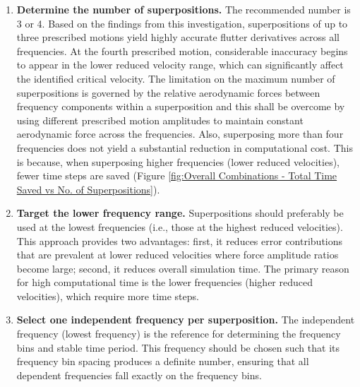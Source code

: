 \documentclass[../main]{subfiles}
\begin{document}
\begin{enumerate}
    \item \textbf{Determine the number of superpositions.} The recommended number is 3 or 4. Based on the 
          findings from this investigation, superpositions of up to three prescribed motions yield highly 
          accurate flutter derivatives across all frequencies.
          At the fourth prescribed motion, considerable 
          inaccuracy begins to appear in the lower reduced velocity range, 
          which can significantly affect the identified critical velocity.
          The limitation on the maximum 
          number of superpositions is governed by the relative aerodynamic forces between frequency components 
          within a superposition and this shall be overcome by using different prescribed motion amplitudes to maintain constant aerodynamic force across the frequencies.
          Also, superposing more than four frequencies does not yield a substantial reduction in 
          computational cost.
          This is because, when superposing higher frequencies (lower reduced velocities), 
          fewer time steps are saved (Figure \ref{fig:Overall Combinations - Total Time Saved vs No. of Superpositions}).

    \item \textbf{Target the lower frequency range.} Superpositions should preferably be used at the lowest 
          frequencies (i.e., those at the highest reduced velocities).
          This approach provides two advantages: first, it reduces error contributions that are prevalent at lower reduced velocities where 
          force amplitude ratios become large;
          second, it reduces overall simulation time. The 
          primary reason for high computational time is the lower frequencies (higher reduced velocities), 
          which require more time steps.

    \item \textbf{Select one independent frequency per superposition.} The independent frequency (lowest frequency) 
          is the reference for determining the frequency 
          bins and stable time period.
          This frequency should be chosen such that its frequency bin spacing 
          produces a definite number, ensuring that all dependent frequencies fall exactly on the frequency bins.


\end{enumerate}
\end{document}
